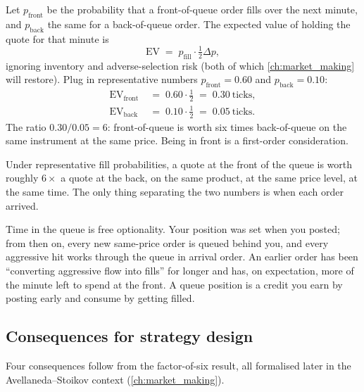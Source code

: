 Let $p_{\mathrm{front}}$ be the probability that a
front-of-queue order fills over the next minute, and
$p_{\mathrm{back}}$ the same for a back-of-queue order. The
expected value of holding the quote for that minute is
\[
  \mathrm{EV}
  \;=\;
  p_{\mathrm{fill}} \cdot \tfrac{1}{2} \Delta p,
\]
ignoring inventory and adverse-selection risk (both of which
\cref{ch:market_making} will restore). Plug in representative
numbers $p_{\mathrm{front}} = 0.60$ and
$p_{\mathrm{back}} = 0.10$:
\begin{align}
  \mathrm{EV}_{\mathrm{front}}
  &\;=\; 0.60 \cdot \tfrac{1}{2} \;=\; 0.30\ \text{ticks}, \\
  \mathrm{EV}_{\mathrm{back}}
  &\;=\; 0.10 \cdot \tfrac{1}{2} \;=\; 0.05\ \text{ticks}.
\end{align}
The ratio $0.30 / 0.05 = 6$: front-of-queue is worth six times
back-of-queue on the same instrument at the same price. Being in
front is a first-order consideration.

\begin{keyfactbox}
Under representative fill probabilities, a quote at the front of
the queue is worth roughly $6\times$ a quote at the back, on
the same product, at the same price level, at the same time. The
only thing separating the two numbers is when each order arrived.
\end{keyfactbox}

\begin{intuitionbox}
Time in the queue is free optionality. Your position was set
when you posted; from then on, every new same-price order is
queued behind you, and every aggressive hit works through the
queue in arrival order. An earlier order has been ``converting
aggressive flow into fills'' for longer and has, on expectation,
more of the minute left to spend at the front. A queue position
is a credit you earn by posting early and consume by getting
filled.
\end{intuitionbox}

\subsection{Consequences for strategy design}

Four consequences follow from the factor-of-six result, all
formalised later in the Avellaneda--Stoikov context
(\cref{ch:market_making}).

